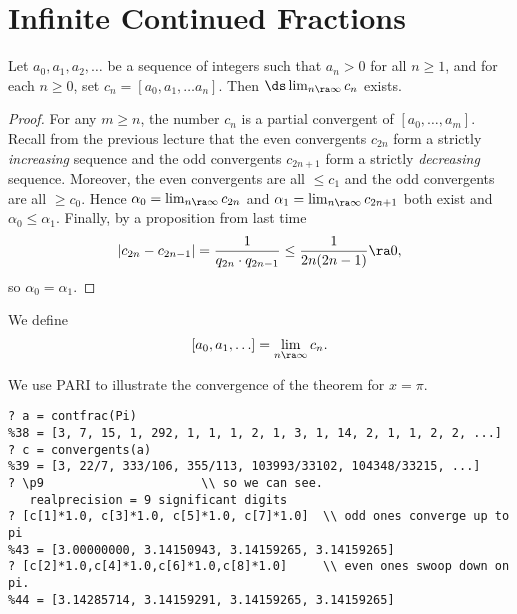 \documentclass[11pt]{report}
\begin{document}
\section{Infinite Continued Fractions}
\begin{theorem}
  Let $a_0, a_1, a_2, \ldots $ be a sequence of integers such that $a_n > 0$ for
  all $n\geq 1$,
  and for each $n\geq 0$, set
  $c_n = [a_0, a_1, \ldots a_n].$
  Then $\ds\lim_{n\ra \infty} c_n$ exists.
\end{theorem}
\begin{proof}
  For any $m\geq n$, the number $c_n$ is a partial convergent of $[a_0, \ldots, a_m]$.
  Recall from the previous lecture that the even convergents $c_{2n}$ form a strictly
    {\em increasing} sequence and the odd convergents $c_{2n+1}$ form a strictly
    {\em decreasing} sequence. Moreover, the even convergents are all $\leq c_1$
  and the odd convergents are all $\geq c_0$.
  Hence $\alpha_0 = \lim_{n\ra \infty} c_{2n}$ and $\alpha_1 = \lim_{n\ra \infty} c_{2n+1}$
  both exist and $\alpha_0\leq \alpha_1$.
  Finally, by a proposition from last time
  $$| c_{2n} - c_{2n-1}|
    = \frac{1}{q_{2n}\cdot q_{2n-1}} \leq
    \frac{1}{2n(2n-1)} \ra 0,
  $$
  so $\alpha_0 = \alpha_1$.
\end{proof}

We define
$$
  [a_0, a_1, \ldots ] = \lim_{n\ra \infty} c_n.
$$

\begin{example}
  We use PARI to illustrate the convergence of the theorem for $x=\pi$.
  \begin{verbatim}
? a = contfrac(Pi)
%38 = [3, 7, 15, 1, 292, 1, 1, 1, 2, 1, 3, 1, 14, 2, 1, 1, 2, 2, ...]
? c = convergents(a)
%39 = [3, 22/7, 333/106, 355/113, 103993/33102, 104348/33215, ...]
? \p9                      \\ so we can see.
   realprecision = 9 significant digits
? [c[1]*1.0, c[3]*1.0, c[5]*1.0, c[7]*1.0]  \\ odd ones converge up to pi
%43 = [3.00000000, 3.14150943, 3.14159265, 3.14159265]
? [c[2]*1.0,c[4]*1.0,c[6]*1.0,c[8]*1.0]     \\ even ones swoop down on pi.
%44 = [3.14285714, 3.14159291, 3.14159265, 3.14159265]
\end{verbatim}
\end{example}
\end{document}
